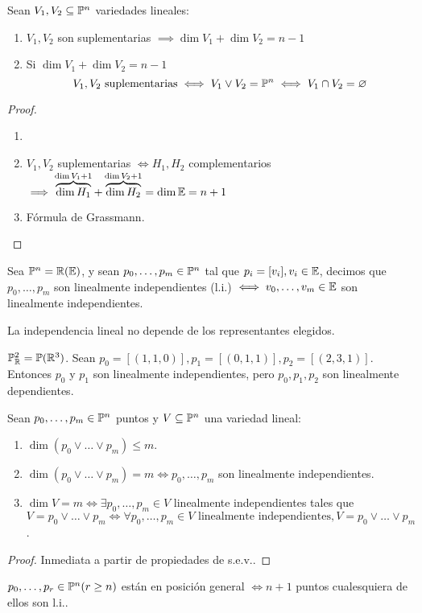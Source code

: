 \begin{prop}
    Sean $V_1, V_2 \subseteq \mathbb{P}^n$ variedades lineales:
    \begin{enumerate}
        \item $V_1, V_2$ son suplementarias $\implies \dim V_1 + \dim V_2 = n-1$
        \item Si $\dim V_1 + \dim V_2 = n-1$
        \[
        V_1, V_2 \text{ suplementarias} \iff V_1 \vee V_2 = \mathbb{P}^n \iff V_1 \cap V_2 = \varnothing
        \]
    \end{enumerate}
\end{prop}
\begin{proof}
    \begin{enumerate}
        \item[]
        \item $V_1, V_2$ suplementarias $\iff H_1, H_2$ complementarios $\implies \overbrace{\dim H_1}^{\dim V_1 + 1} +
        \overbrace{\dim H_2}^{\dim V_2 + 1} = \dim \mathbb{E} = n+1$
        \item Fórmula de Grassmann.
    \end{enumerate}
\end{proof}
\begin{defi}
    Sea $\mathbb{P}^n = \mathbb{R}(\mathbb{E} )$, y sean $p_0, \dots, p_m \in \mathbb{P}^n$ tal que $p_i = [v_i], v_i \in \mathbb{E}$, decimos que $p_0, \dots,
    p_m$ son linealmente independientes (l.i.) $\iff v_0, \dots, v_m \in \mathbb{E}$ son linealmente independientes.
\end{defi}
\begin{obs}
    La independencia lineal no depende de los representantes elegidos.
\end{obs}
\begin{example}
    $\mathbb{P}^2_{\mathbb{R}} = \mathbb{P}(\mathbb{R}^3)$. Sean $p_0 = [(1,1,0)], p_1 = [(0,1,1)], p_2 = [(2,3,1)]$. Entonces $p_0$ y $p_1$ son linealmente
    independientes, pero $p_0, p_1, p_2$ son linealmente dependientes.
\end{example}
\begin{prop}
    Sean $p_0, \dots, p_m \in \mathbb{P}^n$ puntos y $V \subseteq \mathbb{P}^n$ una variedad lineal:
    \begin{enumerate}
        \item $\dim\left( p_0 \vee \dots \vee p_m \right) \leq m$.
        \item $\dim\left( p_0 \vee \dots \vee p_m \right) = m \iff p_0, \dots, p_m$ son linealmente independientes.
        \item $\dim V = m \iff \exists p_0, \dots, p_m \in V$ linealmente independientes tales que $V = p_0 \vee \dots \vee p_m
            \iff \forall p_0, \dots, p_m \in V \text{ linealmente independientes}, V = p_0 \vee \dots \vee p_m$.
    \end{enumerate}
\end{prop}
\begin{proof}
    Inmediata a partir de propiedades de s.e.v..
\end{proof}
\begin{defi}
    $p_0, \dots, p_r \in \mathbb{P}^n (r \geq n)$ están en posición general $\iff n+1$ puntos cualesquiera de ellos son l.i..
\end{defi}

